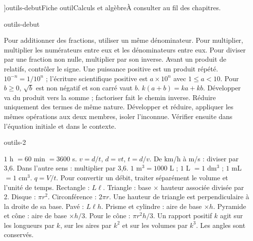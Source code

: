 \editionPage[\pdfbookmark[0]{Fiches outils}{bm-outils-debut-parent}]{outils-debut}{Fiche outil}{Calculs et algèbre}{À consulter au fil des chapitres.}
\begin{blocEdition}{outils-debut}

Pour additionner des fractions, utiliser un même dénominateur. Pour multiplier, multiplier les numérateurs entre eux et les dénominateurs entre eux. Pour diviser par une fraction non nulle, multiplier par son inverse. Avant un produit de relatifs, contrôler le signe.
Une puissance positive est un produit répété. $10^{-n}=1/10^n$ ; l’écriture scientifique positive est $a\times10^n$ avec $1\le a<10$. Pour $b\ge0$, $\sqrt b$ est non négatif et son carré vaut $b$.
$k(a+b)=ka+kb$. Développer va du produit vers la somme ; factoriser fait le chemin inverse. Réduire uniquement des termes de même nature.
Développer et réduire, appliquer les mêmes opérations aux deux membres, isoler l’inconnue. Vérifier ensuite dans l’équation initiale et dans le contexte.
\end{blocEdition}
\begin{blocEdition}{outils-2}

$1$ h $=60$ min $=3600$ s. $v=d/t$, $d=vt$, $t=d/v$. De km/h à m/s : diviser par 3,6. Dans l’autre sens : multiplier par 3,6.
$1$ m$^3=1000$ L ; $1$ L $=1$ dm$^3$ ; $1$ mL $=1$ cm$^3$. $q=V/t$. Pour convertir un débit, traiter séparément le volume et l’unité de temps.
Rectangle : $L\ell$. Triangle : base $\times$ hauteur associée divisée par 2. Disque : $\pi r^2$. Circonférence : $2\pi r$. Une hauteur de triangle est perpendiculaire à la droite de sa base.
Pavé : $L\ell h$. Prisme et cylindre : aire de base $\times h$. Pyramide et cône : aire de base $\times h/3$. Pour le cône : $\pi r^2h/3$.
Un rapport positif $k$ agit sur les longueurs par $k$, sur les aires par $k^2$ et sur les volumes par $k^3$. Les angles sont conservés.
\end{blocEdition}
